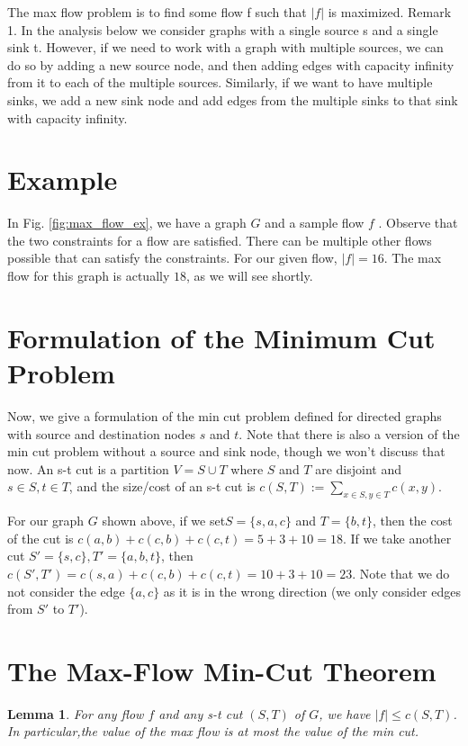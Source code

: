 \documentclass [12pt]{article}
\newtheorem{lemma}[theorem]{Lemma}
\theoremstyle{definition}
\begin{document}
The max flow problem is to find some flow f such that $|f |$ is maximized. Remark 1. In the analysis below we consider graphs with a single source s and a single sink t. However, if we need to work with a graph with multiple sources, we can do so by adding a new source node, and then adding edges with capacity infinity from it to each of the multiple sources. Similarly, if we want to have multiple sinks, we add a new sink node and add edges from the multiple sinks to that sink with capacity infinity.

\section{Example}

In Fig. \ref{fig:max_flow_ex}, we have a graph $G$ and a sample flow $f$ . Observe that the two constraints for a flow are satisfied. There can be multiple other flows possible that can satisfy the constraints. For our given flow, $|f | = 16$. The max flow for this graph is actually $18$, as we will see shortly.


\section{Formulation of the Minimum Cut Problem}

Now, we give a formulation of the min cut problem defined for directed graphs with source and destination nodes $s$ and $t$. Note that there is also a version of the min cut problem without a source and sink node, though we won't discuss that now. An s-t cut is a partition $V = S \cup T$ where $S$ and $T$ are disjoint and $s \in S, t \in T$, and the size/cost of an s-t cut is $c(S, T) := \sum_{x\in S, y\in T} c(x, y )$.

For our graph $G$ shown above, if we set$ S = \{s, a, c\}$ and $T = \{b, t\}$, then the cost of the cut is $c(a, b) + c(c, b) + c(c, t) = 5 + 3 + 10 = 18$. If we take another cut $S
' = \{s, c\}, T' = \{a, b, t\}$, then $c(S', T') = c(s, a) + c(c, b) + c(c, t) = 10 + 3 + 10 = 23$. Note that we do
not consider the edge $\{a, c\}$ as it is in the wrong direction (we only consider edges from $S'$ to $ T'$).


\section{The Max-Flow Min-Cut Theorem}

\begin{lemma}
For any flow $f$ and any s-t cut $(S, T)$ of $G$, we have $|f | \leq c(S, T)$. In particular,the value of the max flow is at most the value of the min cut.
\end{lemma}
\end{document}
